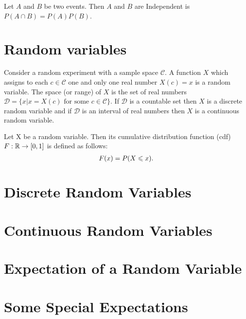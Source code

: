 \begin{definition}{}{}
    Let $A$ and $B$ be two events. Then $A$ and $B$ are Independent is $P(A\cap B)=P(A)P(B)$.
\end{definition}

\section{Random variables}

\begin{definition}{}{}
    Consider a random experiment with a sample space $\mathcal{C}$.
    A function $X$ which assigns to each $c\in\mathcal{C}$ one and only one real number $X(c)=x$ is
    a random variable. The space (or range) of $X$ is the set of real numbers $\mathcal{D}=\{x|x=X(c) \text{ for some } c\in \mathcal{C}\}$.
    If $\mathcal{D}$ is a countable set then $X$ is a discrete random variable and 
    if $\mathcal{D}$ is an interval of real numbers then $X$ is a continuous random variable.
\end{definition}

\begin{definition}{}{}
    Let X be a random variable. 
    Then its cumulative distribution function (cdf) $F:\mathbb{R}\rightarrow [0,1]$
    is defined as follows:
    \begin{align*}
        F(x) = P(X\leqslant x).
    \end{align*}
\end{definition}

\begin{theorem}{}{}
    
\end{theorem}

\section{Discrete Random Variables}

\section{Continuous Random Variables}

\section{Expectation of a Random Variable}

\section{Some Special Expectations}
